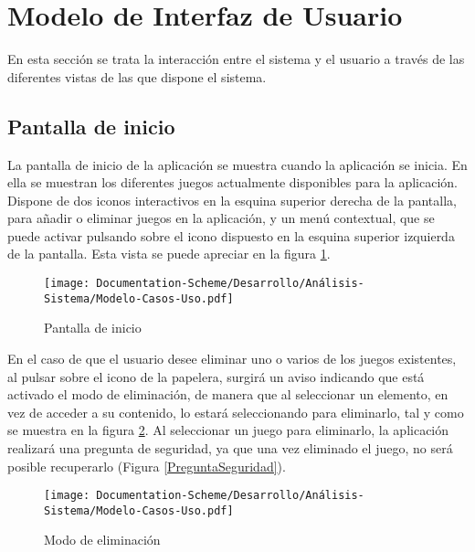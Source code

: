 
\section{Modelo de Interfaz de Usuario}
En esta sección se trata la interacción entre el sistema y el usuario a través de las diferentes vistas 
de las que dispone el sistema.

\subsection{Pantalla de inicio}
La pantalla de inicio de la aplicación se muestra cuando la aplicación se inicia. En ella se 
muestran los diferentes juegos actualmente disponibles para la aplicación.
Dispone de dos iconos interactivos en la esquina superior derecha de la pantalla, para añadir o eliminar 
juegos en la aplicación, y un menú contextual, que se puede activar pulsando sobre el icono dispuesto 
en la esquina superior izquierda de la pantalla. Esta vista se puede apreciar en la figura \ref*{PantallaInicio}.
\newpage

\begin{figure}[H]
    \centering
    \texttt{[image: Documentation-Scheme/Desarrollo/Análisis-Sistema/Modelo-Casos-Uso.pdf]}
    \caption{Pantalla de inicio}
    \label{PantallaInicio}    
\end{figure}

En el caso de que el usuario desee eliminar uno o varios de los juegos existentes, al pulsar sobre el 
icono de la papelera, surgirá un aviso indicando que está activado el modo de eliminación, de manera que 
al seleccionar un elemento, en vez de acceder a su contenido, lo estará seleccionando para eliminarlo, tal 
y como se muestra en la figura \ref*{ModoEliminacion}. Al seleccionar un juego para eliminarlo, 
la aplicación realizará una pregunta de seguridad, ya que una vez eliminado el juego, no será posible 
recuperarlo (Figura \ref{PreguntaSeguridad}).

\begin{figure}[H]
    \centering
    \texttt{[image: Documentation-Scheme/Desarrollo/Análisis-Sistema/Modelo-Casos-Uso.pdf]}
    \caption{Modo de eliminación}
    \label{ModoEliminacion}    
\end{figure}

